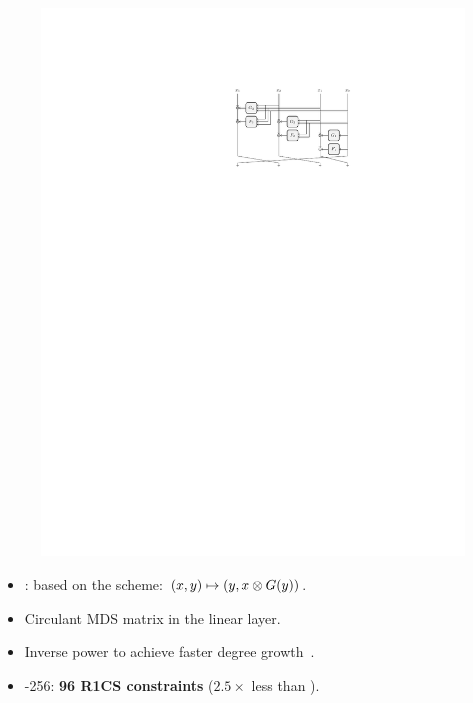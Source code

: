 \documentclass[beamer={10pt,xcolor=dvipsnames},target=mst]{thud}
\begin{document}
\begin{frame}{\Griffin{}~\cite{GrassiHRSWW2022}}
  \begin{figure}
    \centering
    \includegraphics[scale=0.75]{res/GrassiHRSWW2022.pdf}
  \end{figure}

  \begin{itemize}
    \item \Griffin{}: based on the \Horst{} scheme: \(\Tuple{x, y} \mapsto \Tuple{y, x \otimes \call{G}{y}}\).
    \item Circulant MDS matrix in the linear layer.
    \item Inverse power to achieve faster degree growth~\cite{AlyABDS2019}.
    \item \Griffin{}-256: \textbf{96 R1CS constraints} (\(2.5\times \) less than \Poseidon{}).
  \end{itemize}
\end{frame}
\end{document}
